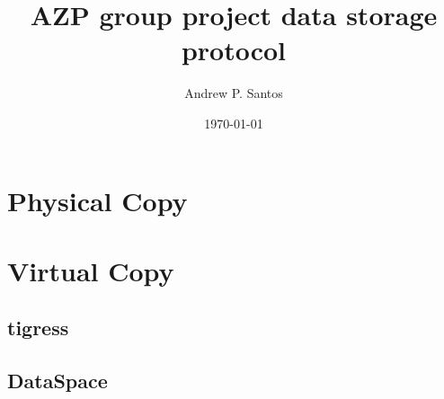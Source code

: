 \documentclass[%
 jcp, numerical,
 amsmath,amssymb,
 preprint,%
]{revtex4-1}
\begin{document}
\title{AZP group project data storage protocol}
\author{Andrew P. Santos} 
\date{\today}
\maketitle
\section{Physical Copy}
\section{Virtual Copy}
\subsection{tigress}
\subsection{DataSpace}
\end{document}
